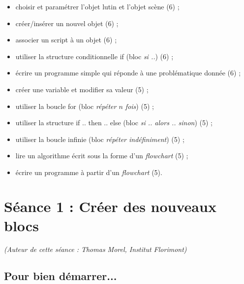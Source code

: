 \begin{itemize}
\item choisir et paramétrer l'objet lutin et l'objet scène (6) ;
\item créer/insérer un nouvel objet (6) ; 
\item associer un script à un objet (6) ;
\item utiliser la structure conditionnelle if (bloc \emph{si ..}) (6) ; 
\item écrire un programme simple qui réponde à une problématique donnée (6) ;
\item créer une variable et modifier sa valeur (5) ;
\item utiliser la boucle for (bloc \emph{répéter $n$ fois}) (5) ;
\item utiliser la structure if .. then .. else (bloc \emph{si .. alors .. sinon}) (5) ; 
\item utiliser la boucle infinie (bloc \emph{répéter indéfiniment}) (5) ;
\item lire un algorithme écrit sous la forme d'un \emph{flowchart} (5) ;
\item écrire un programme à partir d'un \emph{flowchart} (5).
\end{itemize}













%
%
%
%



\section{Séance 1 : Créer des nouveaux blocs}\label{ficheScratch4e1}

{\footnotesize \emph{(Auteur de cette séance : Thomas Morel, Institut Florimont)}}

\vspace{6pt}

\subsection{Pour bien démarrer...}

